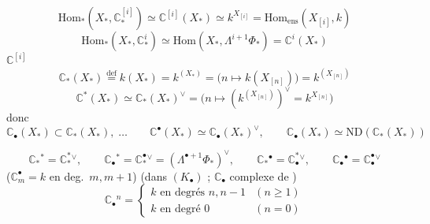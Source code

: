 \documentclass[11pt,a4paper]{article}
\begin{document}
\[
\mathrm{Hom}_*(X_*,\mathbb{C}^{[i]}_*) \simeq \mathbb{C}^{[i]}(X_*) \simeq k^{X_{[i]}} = \mathrm{Hom}_{\mathrm{ens}}(X_{[i]},k)
\]
\[
\mathrm{Hom}_*(X_*,\mathbb{C}^i_*) \simeq \mathrm{Hom}(X_*,\Lambda^{i+1}\Phi_*) = \mathbb{C}^i(X_*)
\]
 $\mathbb{C}^{[i]}$
\[
\mathbb{C}_*(X_*) \overset{\mathrm{def}}{=} k(X_*) = k^{(X_*)} = \bigl(n\mapsto k(X_{[n]})\bigr) = k^{(X_{[n]})}
\]
\[
\mathbb{C}^*(X_*) \simeq \mathbb{C}_*(X_*)^\vee = \bigl(n\mapsto (k^{(X_{[n]})})^\vee = k^{X_{[n]}}\bigr)
\]
donc
\[
\mathbb{C}_\bullet(X_*) \subset \mathbb{C}_*(X_*),\;\ldots \qquad \mathbb{C}^\bullet(X_*) \simeq \mathbb{C}_\bullet(X_*)^\vee,
\qquad \mathbb{C}_\bullet(X_*) \simeq \mathrm{ND}(\mathbb{C}_*(X_*))
\]

\[
\mathbb{C}_*{}^* = \mathbb{C}^*_*{}^\vee, \qquad
\mathbb{C}_\bullet{}^* = \mathbb{C}^\bullet_*{}^\vee = (\Lambda^{\bullet+1}\Phi_*)^\vee, \qquad
\mathbb{C}_*{}^\bullet = \mathbb{C}^*_\bullet{}^\vee, \qquad
\mathbb{C}_\bullet{}^\bullet = \mathbb{C}^\bullet_\bullet{}^\vee
\]
($\mathbb{C}_m^\bullet = k$ en deg.\ $m, m+1$) (dans $(K_\bullet)$ ; $\mathbb{C}_\bullet$ complexe de  \ill{})
\[
\mathbb{C}_\bullet{}^n = \begin{cases} k \text{ en degrés } n, n-1 & (n\ge1) \\ k \text{ en degré } 0 & (n=0) \end{cases}
\]
\end{document}
